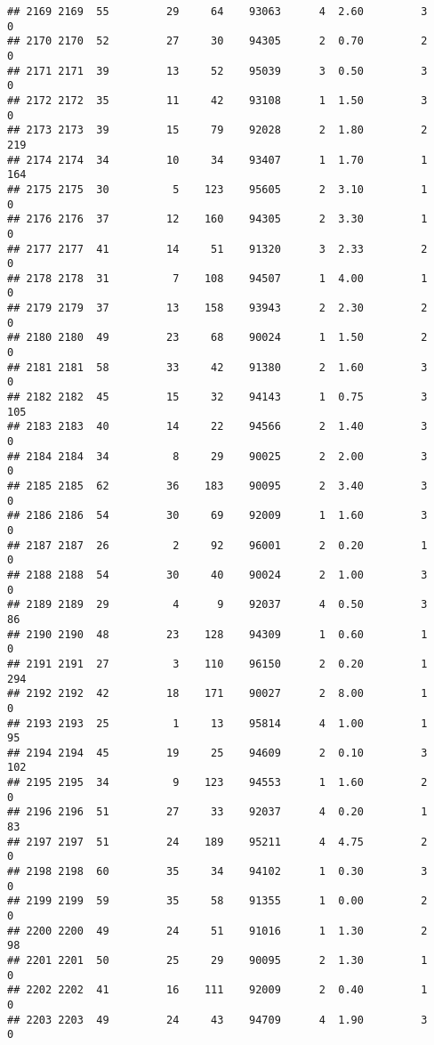 \documentclass[
]{article}
\begin{document}
\begin{verbatim}
## 2169 2169  55         29     64    93063      4  2.60         3        0
## 2170 2170  52         27     30    94305      2  0.70         2        0
## 2171 2171  39         13     52    95039      3  0.50         3        0
## 2172 2172  35         11     42    93108      1  1.50         3        0
## 2173 2173  39         15     79    92028      2  1.80         2      219
## 2174 2174  34         10     34    93407      1  1.70         1      164
## 2175 2175  30          5    123    95605      2  3.10         1        0
## 2176 2176  37         12    160    94305      2  3.30         1        0
## 2177 2177  41         14     51    91320      3  2.33         2        0
## 2178 2178  31          7    108    94507      1  4.00         1        0
## 2179 2179  37         13    158    93943      2  2.30         2        0
## 2180 2180  49         23     68    90024      1  1.50         2        0
## 2181 2181  58         33     42    91380      2  1.60         3        0
## 2182 2182  45         15     32    94143      1  0.75         3      105
## 2183 2183  40         14     22    94566      2  1.40         3        0
## 2184 2184  34          8     29    90025      2  2.00         3        0
## 2185 2185  62         36    183    90095      2  3.40         3        0
## 2186 2186  54         30     69    92009      1  1.60         3        0
## 2187 2187  26          2     92    96001      2  0.20         1        0
## 2188 2188  54         30     40    90024      2  1.00         3        0
## 2189 2189  29          4      9    92037      4  0.50         3       86
## 2190 2190  48         23    128    94309      1  0.60         1        0
## 2191 2191  27          3    110    96150      2  0.20         1      294
## 2192 2192  42         18    171    90027      2  8.00         1        0
## 2193 2193  25          1     13    95814      4  1.00         1       95
## 2194 2194  45         19     25    94609      2  0.10         3      102
## 2195 2195  34          9    123    94553      1  1.60         2        0
## 2196 2196  51         27     33    92037      4  0.20         1       83
## 2197 2197  51         24    189    95211      4  4.75         2        0
## 2198 2198  60         35     34    94102      1  0.30         3        0
## 2199 2199  59         35     58    91355      1  0.00         2        0
## 2200 2200  49         24     51    91016      1  1.30         2       98
## 2201 2201  50         25     29    90095      2  1.30         1        0
## 2202 2202  41         16    111    92009      2  0.40         1        0
## 2203 2203  49         24     43    94709      4  1.90         3        0

\end{verbatim}
\end{document}
